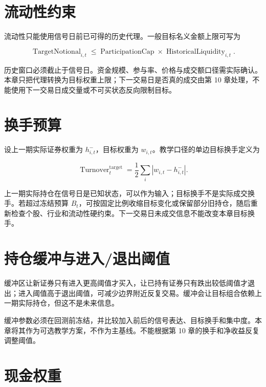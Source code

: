 \section{流动性约束}

流动性只能使用信号日前已可得的历史代理。一般目标名义金额上限可写为

\begin{equation}
  \operatorname{TargetNotional}_{i,t}
  \le
  \operatorname{ParticipationCap}
  \times
  \operatorname{HistoricalLiquidity}_{i,t}.
  \label{eq:ch09-liquidity-cap}
\end{equation}

历史窗口必须截止于信号日。资金规模、参与率、价格与成交额口径需实际确认。本章只把代理转换为目标权重上限；下一交易日是否真的成交由第 10 章处理，不能使用下一交易日成交量或不可买状态反向限制目标。

\section{换手预算}

设上一期实际证券权重为 \(h^-_{i,t}\)，目标权重为 \(w_{i,t}\)。教学口径的单边目标换手定义为

\begin{equation}
  \operatorname{Turnover}^{\mathrm{target}}_t
  = \frac{1}{2}\sum_i\left|w_{i,t}-h^-_{i,t}\right|.
  \label{eq:ch09-target-turnover}
\end{equation}

上一期实际持仓在信号日是已知状态，可以作为输入；目标换手不是实际成交换手。若超过冻结预算 \(B_t\)，可按固定比例收缩目标变化或保留部分旧持仓，随后重新检查个股、行业和流动性硬约束。下一交易日未成交信息不能改变本章目标换手。

\section{持仓缓冲与进入/退出阈值}

缓冲区让新证券只有进入更高阈值才买入，让已持有证券只有跌出较低阈值才退出；进入阈值高于退出阈值，可减少边界附近反复交易。缓冲会让目标组合依赖上一期实际持仓，但这不是未来信息。

缓冲参数必须在回测前冻结，并比较加入前后的信号表达、目标换手和集中度。本章将其作为可选教学方案，不作为主基线。不能根据第 10 章的换手和净收益反复调整阈值。

\section{现金权重}

